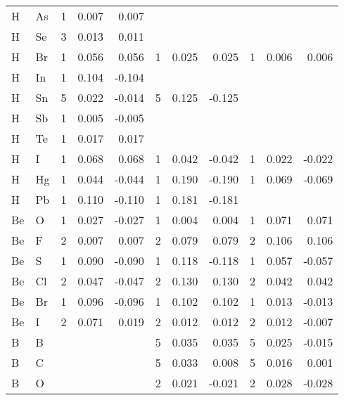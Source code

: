 \begin{table}
\begin{center}
\begin{tabular}{llrrrrrrrrr}
  H &  As &   1 &    0.007 &    0.007 &     &          &          &     &          &          \\
  H &  Se &   3 &    0.013 &    0.011 &     &          &          &     &          &          \\
  H &  Br &   1 &    0.056 &    0.056 &   1 &    0.025 &    0.025 &   1 &    0.006 &    0.006 \\
  H &  In &   1 &    0.104 &   -0.104 &     &          &          &     &          &          \\
  H &  Sn &   5 &    0.022 &   -0.014 &   5 &    0.125 &   -0.125 &     &          &          \\
  H &  Sb &   1 &    0.005 &   -0.005 &     &          &          &     &          &          \\
  H &  Te &   1 &    0.017 &    0.017 &     &          &          &     &          &          \\
  H &   I &   1 &    0.068 &    0.068 &   1 &    0.042 &   -0.042 &   1 &    0.022 &   -0.022 \\
  H &  Hg &   1 &    0.044 &   -0.044 &   1 &    0.190 &   -0.190 &   1 &    0.069 &   -0.069 \\
  H &  Pb &   1 &    0.110 &   -0.110 &   1 &    0.181 &   -0.181 &     &          &          \\
 Be &   O &   1 &    0.027 &   -0.027 &   1 &    0.004 &    0.004 &   1 &    0.071 &    0.071 \\
 Be &   F &   2 &    0.007 &    0.007 &   2 &    0.079 &    0.079 &   2 &    0.106 &    0.106 \\
 Be &   S &   1 &    0.090 &   -0.090 &   1 &    0.118 &   -0.118 &   1 &    0.057 &   -0.057 \\
 Be &  Cl &   2 &    0.047 &   -0.047 &   2 &    0.130 &    0.130 &   2 &    0.042 &    0.042 \\
 Be &  Br &   1 &    0.096 &   -0.096 &   1 &    0.102 &    0.102 &   1 &    0.013 &   -0.013 \\
 Be &   I &   2 &    0.071 &    0.019 &   2 &    0.012 &    0.012 &   2 &    0.012 &   -0.007 \\
  B &   B &     &          &          &   5 &    0.035 &    0.035 &   5 &    0.025 &   -0.015 \\
  B &   C &     &          &          &   5 &    0.033 &    0.008 &   5 &    0.016 &    0.001 \\
  B &   O &     &          &          &   2 &    0.021 &   -0.021 &   2 &    0.028 &   -0.028 \\

\end{tabular}
\end{center}
\end{table}
